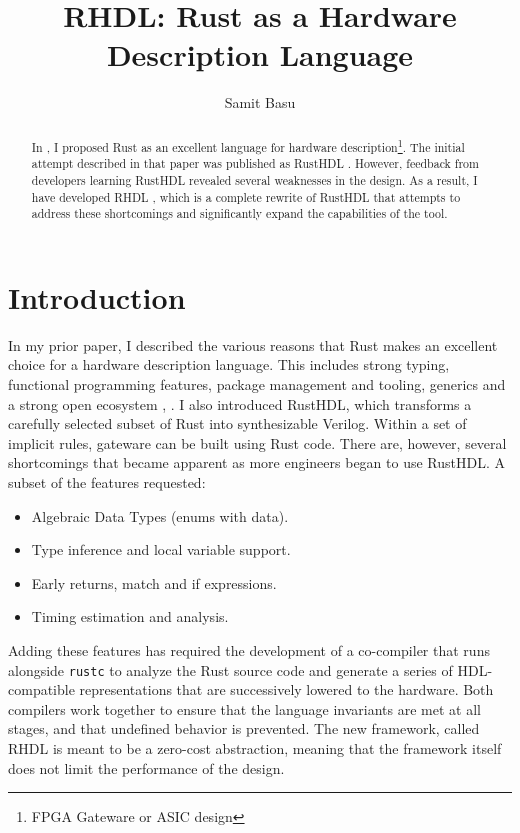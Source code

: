 \documentclass[sigplan,screen,sigconf]{acmart}
\author{Samit Basu}
\affiliation{
  basu.samit@gmail.com
  \country{Fremont CA, USA}
}
\begin{document}
\title{RHDL: Rust as a Hardware Description Language}

\begin{abstract}
In \cite{b13}, I proposed Rust as an excellent language for hardware description\footnote{FPGA Gateware or ASIC design}.  The initial attempt described in that paper was published as RustHDL \cite{b6}.  However, feedback from developers learning RustHDL revealed several weaknesses in the design.  As a result, I have developed RHDL \cite{b10}, which is a complete rewrite of RustHDL that attempts to address these shortcomings and significantly expand the capabilities of the tool.
\end{abstract}

\maketitle

\section{Introduction}
In my prior paper, I described the various reasons that Rust makes an excellent choice for a hardware description language.  This includes strong typing, functional programming features, package management and tooling, generics and a strong open ecosystem \cite{b0}, \cite{b9}. I also introduced RustHDL, which transforms a carefully selected subset of Rust into synthesizable Verilog.  Within a set of implicit rules, gateware can be built using Rust code.  There are, however, several shortcomings that became apparent as more engineers began to use RustHDL.  A subset of the features requested:

\begin{itemize}
\item Algebraic Data Types (enums with data).
\item Type inference and local variable support.
\item Early returns, match and if expressions.
\item Timing estimation and analysis.
\end{itemize}
Adding these features has required the development of a co-compiler that runs alongside \verb|rustc| to analyze the Rust source code and generate a series of HDL-compatible representations that are successively lowered to the hardware. Both compilers work together to ensure that the language invariants are met at all stages, and that undefined behavior is prevented.  The new framework, called RHDL is meant to be a zero-cost abstraction, meaning that the framework itself does not limit the performance of the design.
\end{document}
